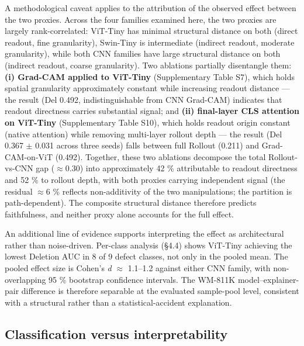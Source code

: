 \documentclass[11pt,a4paper]{article}
\begin{document}
A methodological caveat applies to the attribution of the observed effect between the two proxies. Across the four families examined here, the two proxies are largely rank-correlated: ViT-Tiny has minimal structural distance on both (direct readout, fine granularity), Swin-Tiny is intermediate (indirect readout, moderate granularity), while both CNN families have large structural distance on both (indirect readout, coarse granularity). Two ablations partially disentangle them: \textbf{(i) Grad-CAM applied to ViT-Tiny} (Supplementary Table S7), which holds spatial granularity approximately constant while increasing readout distance --- the result (Del 0.492, indistinguishable from CNN Grad-CAM) indicates that readout directness carries substantial signal; and \textbf{(ii) final-layer CLS attention on ViT-Tiny} (Supplementary Table S10), which holds readout origin constant (native
attention) while removing multi-layer rollout depth --- the result (Del 0.367 $\pm$ 0.031 across three seeds) falls between full Rollout (0.211) and Grad-CAM-on-ViT (0.492). Together, these two ablations decompose the total Rollout-vs-CNN gap ($\approx$0.30) into approximately 42 \% attributable to readout directness and 52 \% to rollout depth, with both proxies carrying independent signal (the residual $\approx$6 \% reflects non-additivity of the two manipulations; the partition is path-dependent). The composite structural distance therefore predicts faithfulness, and neither proxy alone accounts for the full effect.

An additional line of evidence supports interpreting the effect as architectural rather than noise-driven. Per-class analysis (\S{}4.4) shows ViT-Tiny achieving the lowest Deletion AUC in 8 of 9 defect classes, not only in the pooled mean. The pooled effect size is Cohen's \emph{d} $\approx$ 1.1--1.2 against either CNN family, with non- overlapping 95 \% bootstrap confidence intervals. The WM-811K model--explainer-pair difference is therefore separable at the evaluated sample-pool level, consistent with a structural rather than a statistical-accident explanation.

\subsection{Classification versus interpretability}
\end{document}
